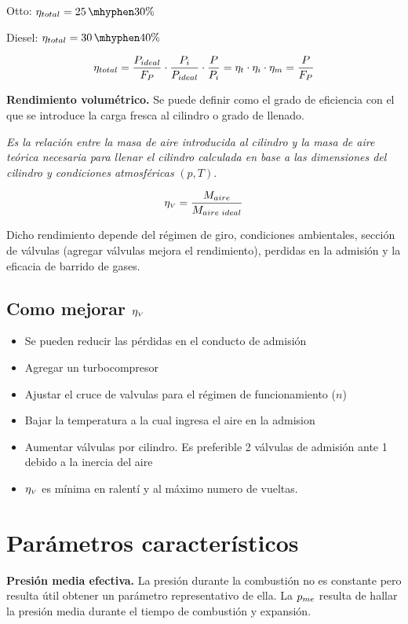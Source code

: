 Otto: $\etaeff=25\hyph30\%$

Diesel: $\etaeff = 30\hyph 40\%$

\[
\eta_{total}=\frac{P_{{ideal}}}{F_P}\cdot\frac{P_i}{P_{ideal}}\cdot \frac{P}{P_i}=\eta_t\cdot \eta_i \cdot \eta_m = \frac{P}{F_P}
\]

\textbf{Rendimiento volumétrico.} Se puede definir como el grado de eficiencia con el que se introduce la carga fresca al cilindro o grado de llenado.

\textit{Es la relación entre la masa de aire introducida al cilindro y la masa de aire teórica necesaria para llenar el cilindro calculada en base a las dimensiones del cilindro y condiciones atmosféricas} $(p,T)$.

\[
\eta_{{\mbox{\tiny$V$}}} = \frac{M_{aire}}{M_{aire\textrm{ }{ideal} }}
\]

Dicho rendimiento depende del régimen de giro, condiciones ambientales, sección de válvulas (agregar válvulas mejora el rendimiento), perdidas en la admisión y la eficacia de barrido de gases.

\subsection[Como mejorar rendimiento volumétrico]{Como mejorar $\eta_{{\mbox{\tiny$V$}}}$}
\begin{itemize}
    \item Se pueden reducir las pérdidas en el conducto de admisión
    \item Agregar un turbocompresor
    \item Ajustar el cruce de valvulas para el régimen de funcionamiento ($n$)
    \item Bajar la temperatura a la cual ingresa el aire en la admision
    \item Aumentar válvulas por cilindro. Es preferible 2 válvulas de admisión ante 1 debido a la inercia del aire
    \item $\eta_{{\mbox{\tiny$V$}}}$ es mínima en ralentí y al máximo numero de vueltas.
\end{itemize}


\section{Parámetros característicos} 


\textbf{Presión media efectiva.} La presión durante la combustión no es constante pero resulta útil obtener un parámetro representativo de ella. La $p_{me}$ resulta de hallar la presión media durante el tiempo de combustión y expansión. 


